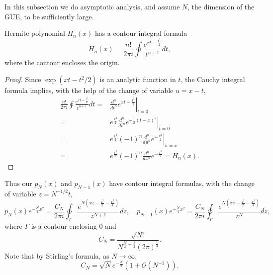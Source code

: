 \documentclass[11pt, a4paper]{article}
\numberwithin{equation}{section}
\newcommand{\bigO}{\mathcal{O}}
\theoremstyle{definition}
\theoremstyle{remark}
\begin{document}
In this subsection we do asymptotic analysis, and assume $N$, the dimension of the GUE, to be sufficiently large.

Hermite polynomial $H_n(x)$ has a contour integral formula
\begin{equation}
  H_n(x) = \frac{n!}{2\pi i} \oint \frac{e^{xt - \frac{t^2}{2}}}{t^{n + 1}} dt,
\end{equation}
where the contour encloses the origin.
\begin{proof}
  Since $\exp(xt - t^2/2)$ is an analytic function in $t$, the Cauchy integral formula implies, with the help of the change of variable $u = x - t$,
  \begin{equation}
    \begin{split}
      \frac{n!}{2\pi i} \oint \frac{e^{xt - \frac{t^2}{2}}}{t^{n + 1}} dt = {}& \left. \frac{d^n}{d t^n} e^{xt - \frac{t^2}{2}} \right\rvert_{t = 0} \\
      = {}& e^{\frac{x^2}{2}} \left. \frac{d^n}{d t^n} e^{-\frac{1}{2}(t - x)^2} \right\rvert_{t = 0} \\
      = {}& e^{\frac{x^2}{2}} (-1)^n \left. \frac{d^n}{d u^n} e^{-\frac{u^2}{2}} \right\rvert_{u = x} \\
      = {}& e^{\frac{x^2}{2}} (-1)^n \frac{d^n}{d x^n} e^{-\frac{x^2}{2}} = H_n(x).
    \end{split}
  \end{equation}
\end{proof}
Thus our $p_N(x)$ and $p_{N - 1}(x)$ have contour integral formulas, with the change of variable $z = N^{-1/2}t$,
\begin{equation} \label{eq:contour_int_p_N_N-1}
  p_N(x) e^{-\frac{N}{4}x^2} = \frac{C_N}{2\pi i} \oint_{\Gamma} \frac{e^{N(xz - \frac{z^2}{2} - \frac{x^2}{4})}}{z^{N + 1}} dz, \quad p_{N - 1}(x) e^{-\frac{N}{4}x^2} = \frac{C_N}{2\pi i} \oint_{\Gamma} \frac{e^{N(xz - \frac{z^2}{2} - \frac{x^2}{4})}}{z^N} dz,
\end{equation}
where $\Gamma$ is a contour enclosing $0$ and
\begin{equation}
  C_N = \frac{\sqrt{N!}}{N^{\frac{N}{2} - \frac{1}{2}} (2\pi)^{\frac{1}{4}}}.
\end{equation}
Note that by Stirling's formula, as $N \to \infty$,
\begin{equation} \label{eq:asy_of_C_N}
  C_N = \sqrt{N}e^{-\frac{N}{2}} (1 + \bigO(N^{-1})).
\end{equation}
\end{document}
